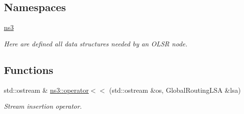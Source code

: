 \subsection*{Namespaces}
\begin{DoxyCompactItemize}
\item 
 \hyperlink{namespacens3}{ns3}
\begin{DoxyCompactList}\small\item\em Here are defined all data structures needed by an O\+L\+SR node. \end{DoxyCompactList}\end{DoxyCompactItemize}
\subsection*{Functions}
\begin{DoxyCompactItemize}
\item 
std\+::ostream \& \hyperlink{namespacens3_a601770c73735f7f9002d8a1fc097d3c4}{ns3\+::operator$<$$<$} (std\+::ostream \&os, Global\+Routing\+L\+SA \&lsa)
\begin{DoxyCompactList}\small\item\em Stream insertion operator. \end{DoxyCompactList}\end{DoxyCompactItemize}
